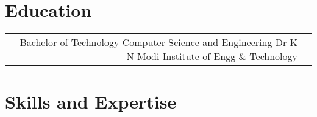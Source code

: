 \documentclass[10pt]{article} %
\begin{document}
\begin{paracol}{2}

\section{Education} 





\begin{supertabular}{rl} %

	
	{Bachelor of Technology} %
	{} %
	{Computer Science and Engineering} %
    {Dr K N Modi Institute of Engg \& Technology} %
	
	
\end{supertabular}


\section{Skills and Expertise} 





\end{paracol}
\end{document}
